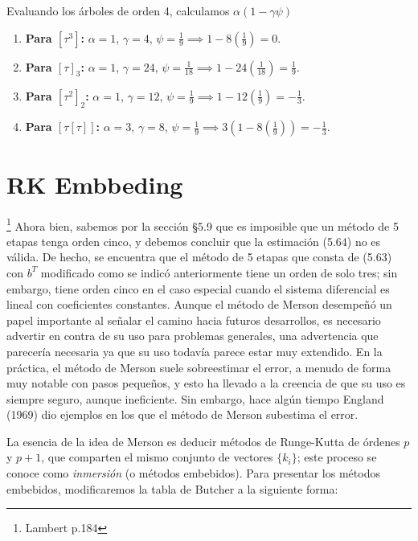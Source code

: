\begin{sol}
\begin{enumerate}
Evaluando los árboles de orden 4, calculamos $\alpha(1-\gamma \psi)$
\begin{enumerate}
    \item \textbf{Para $[\tau^3]$:} $\alpha = 1$, $\gamma = 4$, $\psi = \frac{1}{9} \implies 1 - 8\left(\frac{1}{9}\right) = 0$.
    \item \textbf{Para $[\tau]_3$:} $\alpha = 1$, $\gamma = 24$, $\psi = \frac{1}{18} \implies 1 - 24\left(\frac{1}{18}\right) = \frac{1}{9}$.
    \item \textbf{Para $[\tau^2]_2$:} $\alpha = 1$, $\gamma = 12$, $\psi = \frac{1}{9} \implies 1 - 12\left(\frac{1}{9}\right) = -\frac{1}{3}$.
    \item \textbf{Para $[\tau[\tau]]$:} $\alpha = 3$, $\gamma = 8$, $\psi = \frac{1}{9} \implies 3 \left( 1 - 8\left(\frac{1}{9}\right)  \right) = - \frac{1}{3}$.
\end{enumerate} 
\end{enumerate}
\end{sol}
\section{RK Embbeding} \footnote{Lambert p.184}
Ahora bien, sabemos por la sección §5.9 que es imposible que un método de 5 etapas tenga orden cinco, y debemos concluir que la estimación (5.64) no es válida. De hecho, se encuentra que el método de 5 etapas que consta de (5.63) con $b^T$ modificado como se indicó anteriormente tiene un orden de solo tres; sin embargo, tiene orden cinco en el caso especial cuando el sistema diferencial es lineal con coeficientes constantes. Aunque el método de Merson desempeñó un papel importante al señalar el camino hacia futuros desarrollos, es necesario advertir en contra de su uso para problemas generales, una advertencia que parecería necesaria ya que su uso todavía parece estar muy extendido. En la práctica, el método de Merson suele sobreestimar el error, a menudo de forma muy notable con pasos pequeños, y esto ha llevado a la creencia de que su uso es siempre seguro, aunque ineficiente. Sin embargo, hace algún tiempo England (1969) dio ejemplos en los que el método de Merson subestima el error.

La esencia de la idea de Merson es deducir métodos de Runge-Kutta de órdenes $p$ y $p+1$, que comparten el mismo conjunto de vectores $\{k_i\}$; este proceso se conoce como \emph{inmersión} (o métodos embebidos). Para presentar los métodos embebidos, modificaremos la tabla de Butcher a la siguiente forma:

